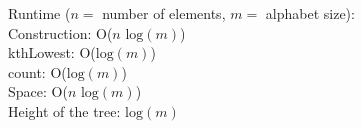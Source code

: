 
Runtime ($n = $ number of elements, $m = $ alphabet size): \\
\indent Construction: O($n\text{ log}(m)$) \\
\indent kthLowest: O($\text{log}(m)$) \\
\indent count: O($\text{log}(m)$) \\
Space: O($n\text{ log}(m)$) \\
\indent Height of the tree: $\text{log}(m)$



\newpage